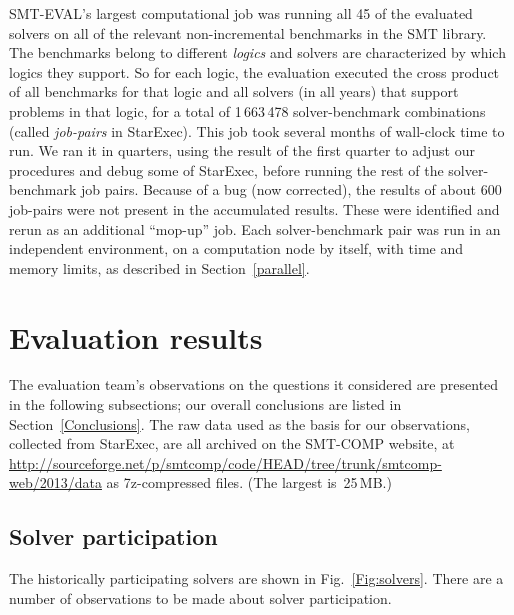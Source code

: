 \documentclass[smallcondensed]{svjour3}
\begin{document}
SMT-EVAL's largest computational job was running all 45 of the evaluated solvers on all of the relevant non-incremental benchmarks in the SMT library. 
The benchmarks belong to different {\em logics} and solvers are characterized by which logics they support. 
So for each logic, the evaluation executed the cross product of all benchmarks for that logic and all solvers (in all years) that support problems in that logic, for a total of 1\,663\,478 solver-benchmark combinations (called {\em job-pairs} in StarExec). 
This job took several months of wall-clock time to run. 
We ran it in quarters, using the result of the first quarter to adjust our procedures and debug some of StarExec, before running the rest of the solver-benchmark job pairs. 
Because of a bug (now corrected), the results of about 600 job-pairs were not present in the accumulated results. 
These were identified and rerun as an additional ``mop-up'' job. 
Each solver-benchmark pair was run in an independent environment, on a computation node by itself, with time and memory limits, as described in Section~\ref{parallel}.

\section{Evaluation results}
\label{Evaluations}

The evaluation team's observations on the questions it considered are presented in the following subsections; our overall conclusions are listed in Section~\ref{Conclusions}.  The raw data used as the basis for our observations, collected from StarExec, are all archived on the SMT-COMP website, at \url{http://sourceforge.net/p/smtcomp/code/HEAD/tree/trunk/smtcomp-web/2013/data} as 7z-compressed files.  (The largest is~25\,MB.)

\subsection{Solver participation}
\label{Solvers}

The historically participating solvers are shown in Fig.~\ref{Fig:solvers}. There are a number of observations to be made about solver participation.
   
\end{document}
